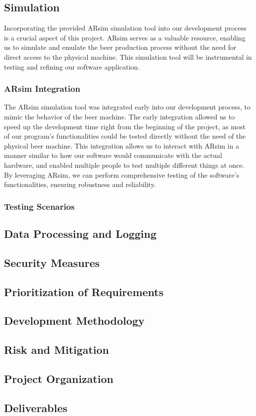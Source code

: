 \subsection{Simulation}
Incorporating the provided ARsim simulation tool into our development process is a crucial aspect of this project. 
ARsim serves as a valuable resource, enabling us to simulate and emulate the beer production process without the need for direct access to the physical machine. 
This simulation tool will be instrumental in testing and refining our software application.

\subsubsection{ARsim Integration}
The ARsim simulation tool was integrated early into our development process, to mimic the behavior of the beer machine.
The early integration allowed us to speed up the development time right from the beginning of the project, as most of our program's functionalities could be tested directly without the need of the physical beer machine.
This integration allows us to interact with ARsim in a manner similar to how our software would communicate with the actual hardware, and enabled multiple people to test multiple different things at once. 
By leveraging ARsim, we can perform comprehensive testing of the software's functionalities, ensuring robustness and reliability.
\subsubsection{Testing Scenarios}

\subsection{Data Processing and Logging}

\subsection{Security Measures}

\subsection{Prioritization of Requirements}

\subsection*{Development Methodology}

\subsection*{Risk and Mitigation}

\subsection{Project Organization}

\subsection{Deliverables}